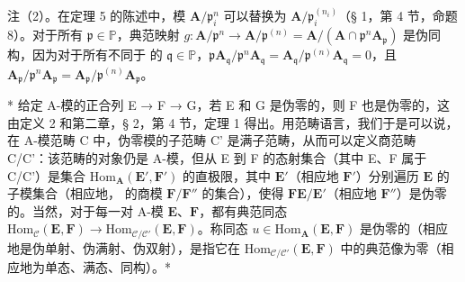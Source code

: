 注（2）。在定理 5 的陈述中，模 \(\mathbf{A} / \mathfrak{p}_i^n\) 可以替换为 \(\mathbf{A} / \mathfrak{p}_i^{(n_i)}\)（§ 1，第 4 节，命题 8）。对于所有 \(\mathfrak{p} \in \mathbb{P}\)，典范映射 \(g\colon \mathbf{A} / \mathfrak{p}^n \to \mathbf{A} / \mathfrak{p}^{(n)} = \mathbf{A} / (\mathbf{A} \cap \mathfrak{p}^n \mathbf{A}_{\mathfrak{p}})\) 是伪同构，因为对于所有不同于  的 \(\mathfrak{q} \in \mathbb{P}\)，\(\mathfrak{p}\)\(\mathbf{A}_{\mathfrak{q}} / \mathfrak{p}^n \mathbf{A}_{\mathfrak{q}} = \mathbf{A}_{\mathfrak{q}} / \mathfrak{p}^{(n)} \mathbf{A}_{\mathfrak{q}} = 0\)，且 \(\mathbf{A}_{\mathfrak{p}} / \mathfrak{p}^n \mathbf{A}_{\mathfrak{p}} = \mathbf{A}_{\mathfrak{p}} / \mathfrak{p}^{(n)} \mathbf{A}_{\mathfrak{p}}\)。

* 给定 A-模的正合列 E → F → G，若 E 和 G 是伪零的，则 F 也是伪零的，这由定义 2 和第二章，§ 2，第 4 节，定理 1 得出。用范畴语言，我们于是可以说，在 A-模范畴 C 中，伪零模的子范畴 C' 是满子范畴，从而可以定义商范畴 C/C'：该范畴的对象仍是 A-模，但从 E 到 F 的态射集合（其中 E、F 属于 C/C'）是集合 \(\mathrm{Hom}_{\mathbf{A}}(\mathbf{E}',\mathbf{F}')\) 的直极限，其中 \(\mathbf{E}'\)（相应地 \(\mathbf{F}'\)）分别遍历 \(\mathbf{E}\) 的子模集合（相应地， 的商模 \(\mathbf{F} / \mathbf{F}''\) 的集合），使得 \(\mathbf{F}\)\(\mathbf{E} / \mathbf{E}'\)（相应地 \(\mathbf{F}''\)）是伪零的。当然，对于每一对 A-模 \(\mathbf{E}\)、\(\mathbf{F}\)，都有典范同态 \(\mathrm{Hom}_{\mathcal{C}}(\mathbf{E},\mathbf{F})\to \mathrm{Hom}_{\mathcal{C} / \mathcal{C}'}(\mathbf{E},\mathbf{F})\)。称同态 \(u\in \mathrm{Hom}_{\mathbf{A}}(\mathbf{E},\mathbf{F})\) 是伪零的（相应地是伪单射、伪满射、伪双射），是指它在 \(\mathrm{Hom}_{\mathcal{C} / \mathcal{C}'}(\mathbf{E},\mathbf{F})\) 中的典范像为零（相应地为单态、满态、同构）。*

